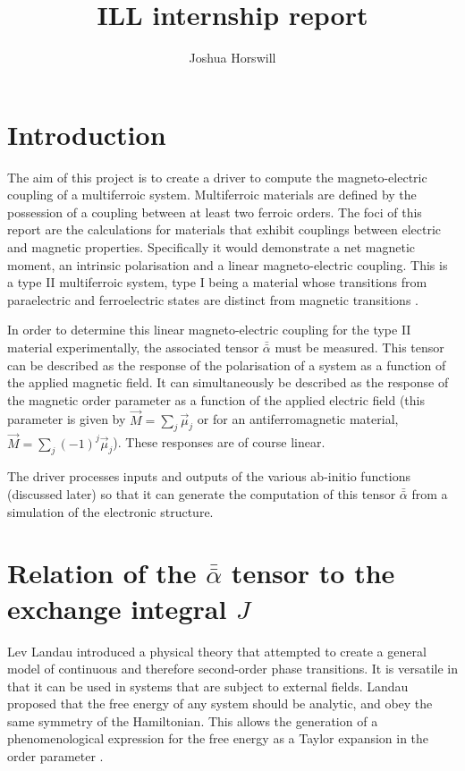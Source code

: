 \documentclass[10pt]{article}
\author{Joshua Horswill}
\title{ILL internship report}
\begin{document}
\maketitle
\tableofcontents
\section{Introduction}
The aim of this project is to create a driver to compute the magneto-electric coupling of a multiferroic system. Multiferroic materials are defined by the possession of a coupling between at least two ferroic orders. The foci of this report are the calculations for materials that exhibit couplings between electric and magnetic properties. Specifically it would demonstrate a net magnetic moment, an intrinsic polarisation and a linear magneto-electric coupling. This is a type II multiferroic system, type I being a material whose transitions from paraelectric and ferroelectric states are distinct from magnetic transitions \cite{Hur2004}\cite{goto2004ferroelectricity}.

In order to determine this linear magneto-electric coupling for the type II material experimentally, the associated tensor $\bar{\bar{\alpha}}$ must be measured. This tensor can be described as the response of the polarisation of a system as a function of the applied magnetic field. It can simultaneously be described as the response of the magnetic order parameter as a function of the applied electric field (this parameter is given by $\vec{M} = \sum_j \vec{\mu}_j$ or for an antiferromagnetic material, $\vec{M} = \sum_j (-1)^j \vec{\mu}_j$). These responses are of course linear.

The driver processes inputs and outputs of the various ab-initio functions (discussed later) so that it can generate the computation of this tensor $\bar{\bar{\alpha}}$ from a simulation of the electronic structure.

\section{Relation of the $\bar{\bar{\alpha}}$ tensor to the exchange integral $J$}

Lev Landau introduced a physical theory that attempted to create a general model of continuous and therefore second-order phase transitions. It is versatile in that it can be used in systems that are subject to external fields. Landau proposed that the free energy of any system should be analytic, and obey the same symmetry of the Hamiltonian. This allows the generation of a phenomenological expression for the free energy as a Taylor expansion in the order parameter \cite{landau1936theory}.
\end{document}
